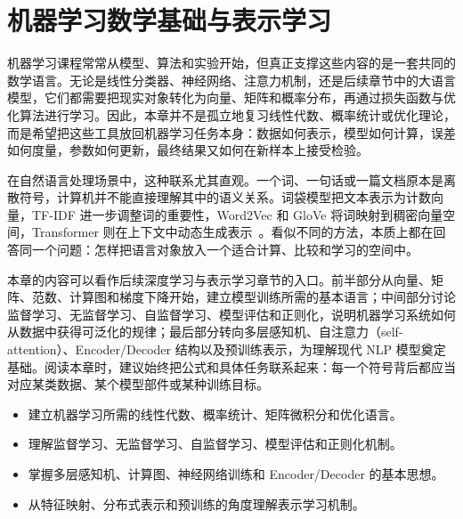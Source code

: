 
\chapter{机器学习数学基础与表示学习}

\providecommand{\sourcefigureplaceholder}[2]{%
  \begin{figure}[htbp]
    \centering
    \fbox{%
      \begin{minipage}[c][4.2cm][c]{0.82\linewidth}
        \centering
        图占位：#2\\[0.5em]
        \footnotesize 原图源：\texttt{\detokenize{#1}}
      \end{minipage}
    }
    \caption{#2（占位）}
  \end{figure}
}

\noindent 机器学习课程常常从模型、算法和实验开始，但真正支撑这些内容的是一套共同的数学语言。无论是线性分类器、神经网络、注意力机制，还是后续章节中的大语言模型，它们都需要把现实对象转化为向量、矩阵和概率分布，再通过损失函数与优化算法进行学习。因此，本章并不是孤立地复习线性代数、概率统计或优化理论，而是希望把这些工具放回机器学习任务本身：数据如何表示，模型如何计算，误差如何度量，参数如何更新，最终结果又如何在新样本上接受检验。

在自然语言处理场景中，这种联系尤其直观。一个词、一句话或一篇文档原本是离散符号，计算机并不能直接理解其中的语义关系。词袋模型把文本表示为计数向量，TF-IDF 进一步调整词的重要性，Word2Vec 和 GloVe 将词映射到稠密向量空间，Transformer 则在上下文中动态生成表示~\cite{ManningEtAl2008IR,MikolovEtAl2013Word2Vec,PenningtonEtAl2014GloVe,VaswaniEtAl2017Transformer}。看似不同的方法，本质上都在回答同一个问题：怎样把语言对象放入一个适合计算、比较和学习的空间中。

本章的内容可以看作后续深度学习与表示学习章节的入口。前半部分从向量、矩阵、范数、计算图和梯度下降开始，建立模型训练所需的基本语言；中间部分讨论监督学习、无监督学习、自监督学习、模型评估和正则化，说明机器学习系统如何从数据中获得可泛化的规律；最后部分转向多层感知机、自注意力（self-attention）、Encoder/Decoder 结构以及预训练表示，为理解现代 NLP 模型奠定基础。阅读本章时，建议始终把公式和具体任务联系起来：每一个符号背后都应当对应某类数据、某个模型部件或某种训练目标。

\begin{learninggoals}
  \begin{itemize}
    \item 建立机器学习所需的线性代数、概率统计、矩阵微积分和优化语言。
    \item 理解监督学习、无监督学习、自监督学习、模型评估和正则化机制。
    \item 掌握多层感知机、计算图、神经网络训练和 Encoder/Decoder 的基本思想。
    \item 从特征映射、分布式表示和预训练的角度理解表示学习机制。
  \end{itemize}
\end{learninggoals}



